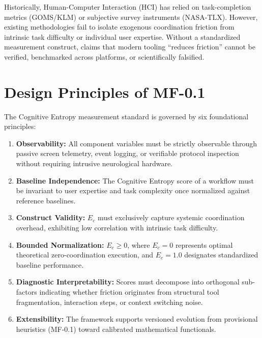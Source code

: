 \documentclass[11pt,a4paper]{article}
\begin{document}
Historically, Human-Computer Interaction (HCI) has relied on task-completion metrics (GOMS/KLM) \cite{card1983psychology, kieras2001using} or subjective survey instruments (NASA-TLX). However, existing methodologies fail to isolate exogenous coordination friction from intrinsic task difficulty or individual user expertise. Without a standardized measurement construct, claims that modern tooling ``reduces friction'' cannot be verified, benchmarked across platforms, or scientifically falsified.

\section{Design Principles of MF-0.1}
The Cognitive Entropy measurement standard is governed by six foundational principles:
\begin{enumerate}
    \item \textbf{Observability:} All component variables must be strictly observable through passive screen telemetry, event logging, or verifiable protocol inspection without requiring intrusive neurological hardware.
    \item \textbf{Baseline Independence:} The Cognitive Entropy score of a workflow must be invariant to user expertise and task complexity once normalized against reference baselines.
    \item \textbf{Construct Validity:} $E_c$ must exclusively capture systemic coordination overhead, exhibiting low correlation with intrinsic task difficulty.
    \item \textbf{Bounded Normalization:} $E_c \ge 0$, where $E_c = 0$ represents optimal theoretical zero-coordination execution, and $E_c = 1.0$ designates standardized baseline performance.
    \item \textbf{Diagnostic Interpretability:} Scores must decompose into orthogonal sub-factors indicating whether friction originates from structural tool fragmentation, interaction steps, or context switching noise.
    \item \textbf{Extensibility:} The framework supports versioned evolution from provisional heuristics (MF-0.1) toward calibrated mathematical functionals.
\end{enumerate}
\end{document}
